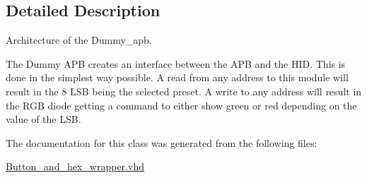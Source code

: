 \subsection{Detailed Description}
Architecture of the Dummy\-\_\-apb. 

The Dummy A\-P\-B creates an interface between the A\-P\-B and the H\-I\-D. This is done in the simplest way possible. A read from any address to this module will result in the 8 L\-S\-B being the selected preset. A write to any address will result in the R\-G\-B diode getting a command to either show green or red depending on the value of the L\-S\-B. 

The documentation for this class was generated from the following files\-:\begin{DoxyCompactItemize}
\item 
\hyperlink{Button__and__hex__wrapper_8vhd}{Button\-\_\-and\-\_\-hex\-\_\-wrapper.\-vhd}\end{DoxyCompactItemize}
